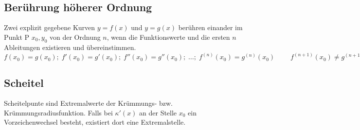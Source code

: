 \subsection{Berührung höherer Ordnung}
Zwei explizit gegebene Kurven $y = f(x)$ und $y = g(x)$ berühren einander im
Punkt P $x_0, y_0$ von der Ordnung $n$, wenn die Funktionswerte und die ersten
$n$ Ableitungen existieren und übereinstimmen.\\
$f(x_0) = g(x_0);\; f'(x_0) = g'(x_0);\; f''(x_0) = g''(x_0);\;\ldots ;
\;f^{(n)}(x_0) = g^{(n)}(x_0)\; \qquad f^{(n+1)}(x_0) \neq g^{(n+1)}(x_0)$

\subsection{Scheitel }
Scheitelpunte sind Extremalwerte der Krümmungs- bzw. Krümmungsradiusfunktion.
Falls bei $\kappa'(x)$ an der Stelle $x_0$ ein Vorzeichenwechsel besteht, existiert dort
eine Extremalstelle. 


